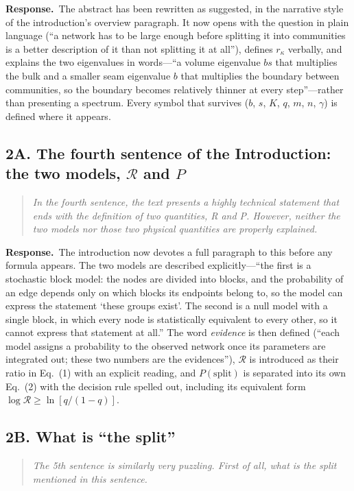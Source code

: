 \documentclass[11pt]{article}
\newcommand{\rk}{r_{\kappa}}
\newcommand{\Rev}{\mathcal{R}}
\newcommand{\logR}{\log \Rev}
\newenvironment{point}{\begin{quote}\itshape}{\end{quote}}
\newcommand{\reply}{\par\noindent\textbf{Response.}\ }
\begin{document}
\reply The abstract has been rewritten as suggested, in the narrative style of
the introduction's overview paragraph. It now opens with the question in plain
language (``a network has to be large enough before splitting it into
communities is a better description of it than not splitting it at all''),
defines $\rk$ verbally, and explains the two eigenvalues in words---``a volume
eigenvalue $bs$ that multiplies the bulk and a smaller seam eigenvalue $b$ that
multiplies the boundary between communities, so the boundary becomes relatively
thinner at every step''---rather than presenting a spectrum. Every symbol that
survives ($b$, $s$, $K$, $q$, $m$, $n$, $\gamma$) is defined where it appears.

\subsection*{2A. The fourth sentence of the Introduction: the two models, $\Rev$ and $P$}

\begin{point}
In the fourth sentence, the text presents a highly technical statement that
ends with the definition of two quantities, R and P. However, neither the two
models nor those two physical quantities are properly explained.
\end{point}

\reply The introduction now devotes a full paragraph to this before any formula
appears. The two models are described explicitly---``the first is a stochastic
block model: the nodes are divided into blocks, and the probability of an edge
depends only on which blocks its endpoints belong to, so the model can express
the statement `these groups exist'. The second is a null model with a single
block, in which every node is statistically equivalent to every other, so it
cannot express that statement at all.'' The word \emph{evidence} is then
defined (``each model assigns a probability to the observed network once its
parameters are integrated out; these two numbers are the evidences''), $\Rev$
is introduced as their ratio in Eq.~(1) with an explicit reading, and
$P(\text{split})$ is separated into its own Eq.~(2) with the decision rule
spelled out, including its equivalent form $\logR\ge\ln[q/(1-q)]$.

\subsection*{2B. What is ``the split''}

\begin{point}
The 5th sentence is similarly very puzzling. First of all, what is the split
mentioned in this sentence.
\end{point}
\end{document}
